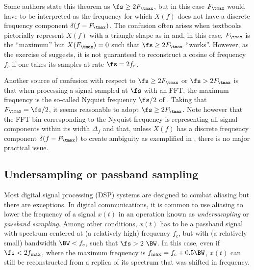 %
Some authors state this theorem as $\fs \geq 2 F_\tmax$, but in this case $F_\tmax$ would have to be interpreted as the frequency for which $X(f)$ does not have a discrete frequency component $\delta(f-F_\tmax)$. The confusion often arises when textbooks pictorially represent $X(f)$ with a triangle shape as in  and, in this case, $F_\tmax$ is the ``maximum'' but $X(F_\tmax)=0$ such that $\fs \geq 2 F_\tmax$ ``works''. However, as the exercise of  suggests, it is not guaranteed to reconstruct a cosine of frequency $f_c$ if one takes its samples at rate $\fs = 2 f_c$.

Another source of confusion with respect to $\fs \geq 2 F_\tmax$ or $\fs > 2 F_\tmax$ is that when processing a signal sampled at $\fs$ with an FFT, the maximum frequency is the so-called Nyquist frequency $\fs/2$ of . Taking that $F_\tmax = \fs / 2$, it seems reasonable to adopt $\fs \geq 2 F_\tmax$. Note however that the FFT bin corresponding to the Nyquist frequency is representing all signal components within its width $\Delta_f$ and that, unless $X(f)$ has a discrete frequency component $\delta(f-F_\tmax)$ to create ambiguity as exemplified in , there is no major practical issue.


\subsection{Undersampling or passband sampling}
\label{sec:undersampling}

Most digital signal processing (DSP) systems are designed to combat aliasing but there are exceptions. In digital communications, it is common to use aliasing to lower the frequency of a signal $x(t)$ in an operation known as \emph{undersampling} or \emph{passband sampling}. Among other conditions, $x(t)$ has to be a passband signal with spectrum centered at (a relatively high) frequency $f_c$, but with (a relatively small) bandwidth $\BW < f_c$, such that $\fs > 2~\BW$. In this case, even if $\fs < 2 f_{\textrm{max}}$, where the maximum frequency is $f_{\textrm{max}} = f_c + 0.5 \BW$, $x(t)$ can still be reconstructed from a replica of its spectrum that was shifted in frequency.

